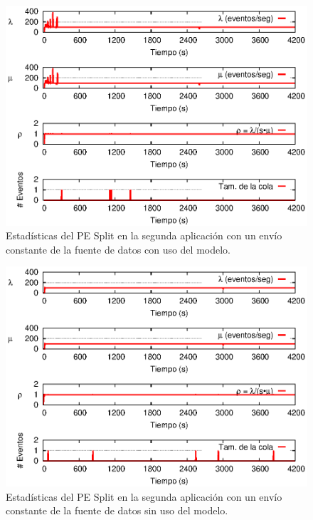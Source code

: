 \begin{figure}[!ht]
\centering
    \includegraphics[scale=1.1]{images/exp/app2/uniform/cm/statusSplitPE.eps}
    \caption{Estad\'isticas del PE Split en la segunda aplicaci\'on con un env\'io constante de la fuente de datos con uso del modelo.}
    \label{fig:app2-uniform-statusSplitPE-cm}
\end{figure}

\begin{figure}[!ht]
\centering
    \includegraphics[scale=1.1]{images/exp/app2/uniform/sm/statusSplitPE.eps}
    \caption{Estad\'isticas del PE Split en la segunda aplicaci\'on con un env\'io constante de la fuente de datos sin uso del modelo.}
    \label{fig:app2-uniform-statusSplitPE-sm}
\end{figure}

